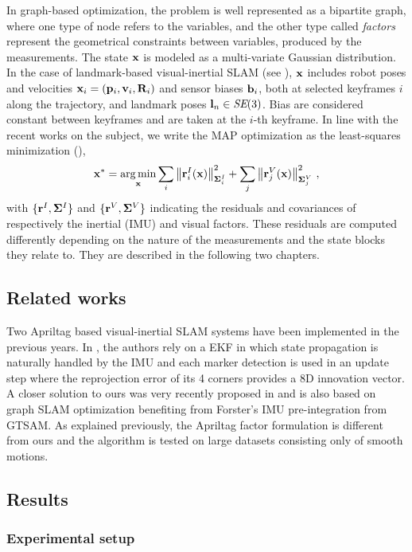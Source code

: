 In graph-based optimization, the problem is well represented as a bipartite graph, where one type of node refers to the variables, 
and the other type called \emph{factors} represent the geometrical constraints between variables, produced by the measurements.
%
The state ${\bf x}$ is modeled as a multi-variate Gaussian distribution.
In the case of landmark-based visual-inertial SLAM (see ), ${\bf x}$ includes robot poses and velocities 
${\bf x}_i=({\bf p}_i,{\bf v}_i,{\bf R}_i)$ and sensor biases ${\bf b}_i$, both at selected keyframes $i$ along the trajectory, and landmark poses ${\bf l}_n\in\textit{SE}(3)$.
Bias are considered constant between keyframes and are taken at the $i$-th keyframe.
%
In line with the recent works on the subject, we write the MAP optimization as the least-squares minimization (),
%
\begin{align}\label{equ:least_squares}
    {\bf x}^* = \operatorname*{arg\,min}_{\bf x} 
    \sum_i {\left\|{\bf r}^I_i({\bf x})\right\|}_{{\bm \Sigma}^I_i}^2
    +
    \sum_j {\left\|{\bf r}^V_j({\bf x})\right\|}_{{\bm \Sigma}^V_j}^2
~,
\end{align}
%
with $\{{\bf r}^I,{\bm \Sigma}^I\}$ and $\{{\bf r}^V,{\bm \Sigma}^V\}$ indicating the residuals and covariances of respectively the inertial (IMU) and visual factors.
These residuals are computed differently depending on the nature of the measurements and the state blocks they relate to. 
They are described in the following two chapters.




\subsection{Related works}
Two Apriltag based visual-inertial SLAM systems have been implemented in the previous years. 
In \cite{neunert2016open}, the authors rely on a EKF in which state propagation is naturally 
handled by the IMU and each marker detection is used in an update step where the reprojection error of its 4 corners provides a 8D innovation vector. 
A closer solution to ours was very recently proposed in \cite{he2019lightweight} and is also based on graph SLAM optimization benefiting from 
Forster's IMU pre-integration from GTSAM. As explained previously, the Apriltag factor formulation is different from ours and the algorithm is tested 
on large datasets consisting only of smooth motions.


\subsection{Results}

\subsubsection{Experimental setup}
